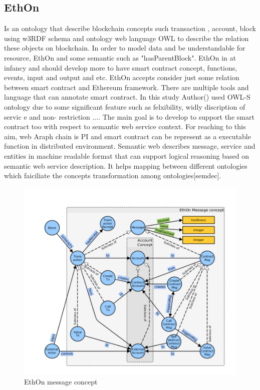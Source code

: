 \subsection{EthOn}
Is an ontology that describe blockchain concepts such transaction , account, block using w3RDF
 schema and ontology web language OWL to describe the relation these objects on blockchain.
In order to model data and be understandable for resource, EthOn and some semantic such as "hasParentBlock".
EthOn in at infancy and should develop more to have smart contract concept, functions, events, input and output and etc.
EthOn accepts consider just some relation between smart contract and Ethereum framework. There are multiple tools and language that can annotate smart contract. In this study Author() used OWL-S ontology due to some significant feature such as felxibility, widly discription of servic e and non- restriction ....
The main goal is to develop to support the smart contract too with respect to semantic web service context.
For reaching to this aim, web Araph chain is PI and smart contract can be represent as a executable function in distributed environment. Semantic web describes message, service and entities in machine readable format that can support logical reasoning based on semantic web service description. It helps mapping between different ontologies which faiciliate the concepts transformation among ontologies[semdec]. 

  
 \begin{center}
	\begin{figure}[htb!]
		
		\begin{minipage}{0.55\linewidth}
			\centering
			\includegraphics[width=1.65\textwidth]{images/chap02_EthOn.jpg}
		\end{minipage}
		\caption[EthOn message concept]{EthOn message concept}
		
	\end{figure}
	
\end{center}
